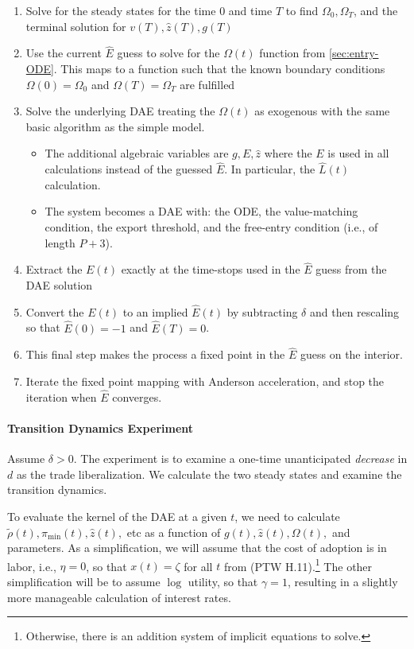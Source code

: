 \documentclass[11pt]{article}
\begin{document}
\begin{enumerate}
	\item Solve for the steady states for the time $0$ and time $T$ to find $\Omega_0, \Omega_T$, and the terminal solution for $v(T),\hat{z}(T),g(T)$
	\item Use the current $\hat{E}$ guess to solve for the $\Omega(t)$ function from \cref{sec:entry-ODE}.  This maps to a function such that the known boundary conditions $\Omega(0) = \Omega_0$ and $\Omega(T) = \Omega_T$ are fulfilled
	\item Solve the underlying DAE treating the $\Omega(t)$ as exogenous with the same basic algorithm as the simple model.   
	\begin{itemize}
		\item The additional algebraic variables are $g, E, \hat{z}$ where the $E$ is used in all calculations instead of the guessed $\hat{E}$.  In particular, the $\hat{L}(t)$ calculation.
		\item The system becomes a DAE with: the ODE, the value-matching condition, the export threshold, and the free-entry condition  (i.e., of length $P + 3$).
	\end{itemize}
	\item Extract the $E(t)$ exactly at the time-stops used in the $\hat{E}$ guess from the DAE solution
	\item Convert the $E(t)$ to an implied $\hat{E}(t)$ by subtracting $\delta$ and then rescaling so that $\hat{E}(0) = -1$ and $\hat{E}(T) = 0$.
	\item This final step makes the process a fixed point in the $\hat{E}$ guess on the interior.
	\item Iterate the fixed point mapping with Anderson acceleration, and stop the iteration when $\hat{E}$ converges.
\end{enumerate}


\paragraph{Transition Dynamics Experiment}

Assume $\delta > 0$. The experiment is to examine a one-time unanticipated \textit{decrease} in $d$ as the trade liberalization.  We calculate the two steady states and examine the transition dynamics.

To evaluate the kernel of the DAE at a given $t$, we need to calculate $\tilde{\rho}(t), \pi_{\min}(t),\hat{z}(t),$ etc  as a function of $g(t), \hat{z}(t), \Omega(t),$ and parameters.  As a simplification, we will assume that the cost of adoption is in labor, i.e., $\eta = 0$, so that $x(t) = \zeta$ for all $t$ from (PTW H.11).\footnote{Otherwise, there is an addition system of implicit equations to solve.}  The other simplification will be to assume $\log$ utility, so that $\gamma = 1$, resulting in a slightly more manageable calculation of interest rates.
\end{document}
